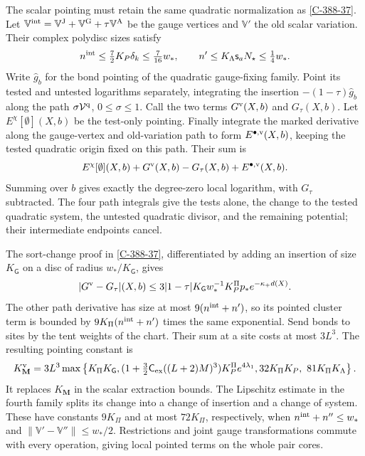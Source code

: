 \documentclass[11pt,letterpaper,reqno]{amsart}
\theoremstyle{definition}
\theoremstyle{remark}
\begin{document}
The scalar pointing must retain the same quadratic
normalization as \cref{C-388-37}.  Let
$\mathbb V^{\rm int}=\mathbb V^{\rm J}+\mathbb V^{\rm G}
 +\tau\mathbb V^{\rm A}$ be the gauge vertices and
$\mathbb V'$ the old scalar variation.  Their complex
polydisc sizes satisfy
\[
 n^{\rm int}\le\tfrac72K_P\delta_k\le\tfrac7{16}w_*,
 \qquad n'\le K_\Lambda\mathsf s_aN_\star\le\tfrac14w_*.
\]
Write $\widehat g_b$ for the bond pointing of the
quadratic gauge-fixing family.  Point its tested and
untested logarithms separately, integrating the
insertion $-(1-\tau)\widehat g_b$ along the path
$\sigma\mathcal V^{\rm q}$, $0\le\sigma\le1$.
Call the two terms $G^{\rm v}(X,b)$ and $G_\tau(X,b)$.
Let $E^\chi[\emptyset](X,b)$ be the test-only pointing.
Finally integrate the marked derivative along the
gauge-vertex and old-variation path to form
$E^{\bullet,\rm v}(X,b)$, keeping the tested quadratic
origin fixed on this path.  Their sum is
\[
 E^\chi[\emptyset](X,b)+G^{\rm v}(X,b)-G_\tau(X,b)
                                      +E^{\bullet,\rm v}(X,b).
\]
Summing over $b$ gives exactly the degree-zero local
logarithm, with $G_\tau$ subtracted.  The four path
integrals give the tests alone, the change to the
tested quadratic system, the untested quadratic
divisor, and the remaining potential; their
intermediate endpoints cancel.

The sort-change proof in \cref{C-388-37}, differentiated
by adding an insertion of size $K_{\mathsf G}$ on a
disc of radius $w_*/K_{\mathsf G}$, gives
\[
 |G^{\rm v}-G_\tau|(X,b)
 \le3|1-\tau|K_{\mathsf G}w_*^{-1}K_P^\Pi p_*
                         e^{-\kappa_+d(X)}.
\]
The other path derivative has size at most
$9(n^{\rm int}+n')$, so its pointed cluster term is
bounded by $9K_\Pi(n^{\rm int}+n')$ times the same
exponential.  Send bonds to sites by the tent weights
of the chart.  Their sum at a site costs at most
$3L^3$.  The resulting pointing constant is
\[
 K_{\mathbf M}^{\rm v}=3L^3\max\left\{
 K_\Pi K_{\mathsf G},
 (1+\tfrac32\mathsf C_{\rm ex}((L+2)M)^3)K_P^\Pi e^{4\lambda_1},
 32K_\Pi K_P,\ 81K_\Pi K_\Lambda\right\}.
\]
It replaces $K_{\mathbf M}$ in the scalar extraction
bounds.  The Lipschitz estimate in the fourth family
splits its change into a change of insertion and a
change of system.  These have constants $9K_\Pi$
and at most $72K_\Pi$, respectively, when
$n^{\rm int}+n''\le w_*$ and
$\|\mathbb V'-\mathbb V''\|\le w_*/2$.
Restrictions and joint gauge transformations commute
with every operation, giving local pointed terms
on the whole pair cores.
\end{document}
